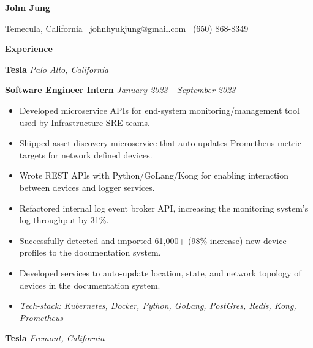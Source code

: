 \documentclass[11pt]{article}
\begin{document}
\begin{center}
    {\huge \textbf{John Jung}}\\ 
\end{center}

\begin{center}
    Temecula, California \textbullet \ johnhyukjung@gmail.com \textbullet \ (650) 868-8349 \\ 
    \hrulefill
\end{center}


\begin{center}
    \textbf{Experience}
\end{center}
\textbf{Tesla} \hfill \textit{Palo Alto, California}

\textbf{Software Engineer Intern} \hfill \textit{January 2023 - September 2023}
\begin{itemize}[noitemsep, topsep=0pt, partopsep=0pt, parsep=0pt]
    \item Developed microservice APIs for end-system monitoring/management tool used by Infrastructure SRE teams.
    \item Shipped asset discovery microservice that auto updates Prometheus metric targets for network defined devices.
    \item Wrote REST APIs with Python/GoLang/Kong for enabling interaction between devices and logger services.
    \item Refactored internal log event broker API, increasing the monitoring system's log throughput by 31\%.
    \item Successfully detected and imported 61,000+ (98\% increase) new device profiles to the documentation system.
    \item Developed services to auto-update location, state, and network topology of devices in the documentation system.
    \item \textit{Tech-stack: Kubernetes, Docker, Python, GoLang, PostGres, Redis, Kong, Prometheus}
\end{itemize}

\vspace{8pt}

\textbf{Tesla} \hfill \textit{Fremont, California}
\end{document}
